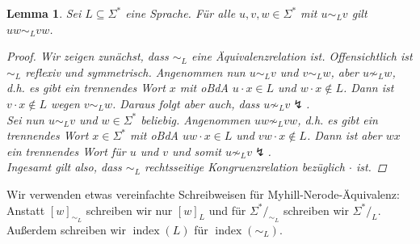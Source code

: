 \documentclass[11pt, a4paper]{article}
\theoremstyle{definition}
\theoremstyle{plain}
\newtheorem{lemma}[definition]{Lemma}
\numberwithin{equation}{section}
\DeclareMathOperator{\ind}{index}
\begin{document}
\begin{lemma}\label{lem:mncongruence}
	Sei $L \subseteq \Sigma^\ast$ eine Sprache. Für alle $u, v, w \in \Sigma^\ast$ mit $u \sim_L v$ gilt $uw \sim_L vw$.
	\begin{proof}
		Wir zeigen zunächst, dass $\sim_L$ eine Äquivalenzrelation ist. Offensichtlich ist $\sim_L$ reflexiv und symmetrisch. Angenommen nun $u \sim_L v$ und $v \sim_L w$, aber $u \not\sim_L w$, d.h. es gibt ein trennendes Wort $x$ mit oBdA $u \cdot x \in L$ und $w \cdot x \notin L$. Dann ist $v \cdot x \notin L$ wegen $v \sim_L w$. Daraus folgt aber auch, dass $u \not\sim_L v \lightning$.\\
		Sei nun $u \sim_L v$ und $w \in \Sigma^\ast$ beliebig. Angenommen $uw \not\sim_L vw$, d.h. es gibt ein trennendes Wort $x \in \Sigma^\ast$ mit oBdA $uw \cdot x \in L$ und $vw \cdot x \notin L$. Dann ist aber $wx$ ein trennendes Wort für $u$ und $v$ und somit $u \not\sim_L v \lightning$.\\
		Ingesamt gilt also, dass $\sim_L$ rechtsseitige Kongruenzrelation bezüglich $\cdot$ ist.
	\end{proof}
\end{lemma}
Wir verwenden etwas vereinfachte Schreibweisen für Myhill-Nerode-Äquivalenz: Anstatt $[w]_{\sim_L}$ schreiben wir nur $[w]_L$ und für $\Sigma^\ast /_{\sim_L}$ schreiben wir $\Sigma^\ast /_L$. Außerdem schreiben wir $\ind(L)$ für $\ind(\sim_L)$.
\end{document}
